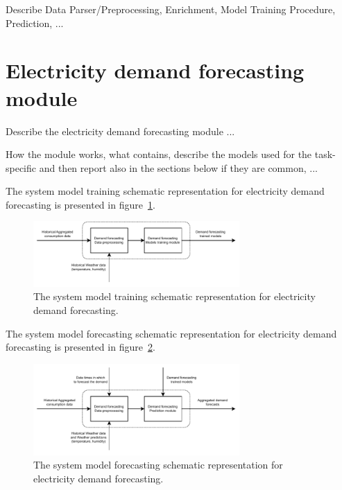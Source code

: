 Describe Data Parser/Preprocessing, Enrichment, Model Training Procedure, Prediction, ...


\section{Electricity demand forecasting module}
\label{sec:demandmodel}
\vspace{0.2 cm}

Describe the electricity demand forecasting module ...

How the module works, what contains, describe the models used for the task-specific and then report also in the sections below if they are common, ...

The system model training schematic representation for electricity demand forecasting is presented in figure~\ref{fig:modeltrainingdemand}.

\begin{figure}[H]
\centering 
\includegraphics[width=0.7\textwidth]{images/system_model_training_demand}
\caption{The system model training schematic representation for electricity demand forecasting.}
\label{fig:modeltrainingdemand}
\end{figure}

The system model forecasting schematic representation for electricity demand forecasting is presented in figure~\ref{fig:modelforecastingdemand}.

\begin{figure}[H]
\centering 
\includegraphics[width=0.7\textwidth]{images/system_model_forecasting_demand}
\caption{The system model forecasting schematic representation for electricity demand forecasting.}
\label{fig:modelforecastingdemand}
\end{figure}


